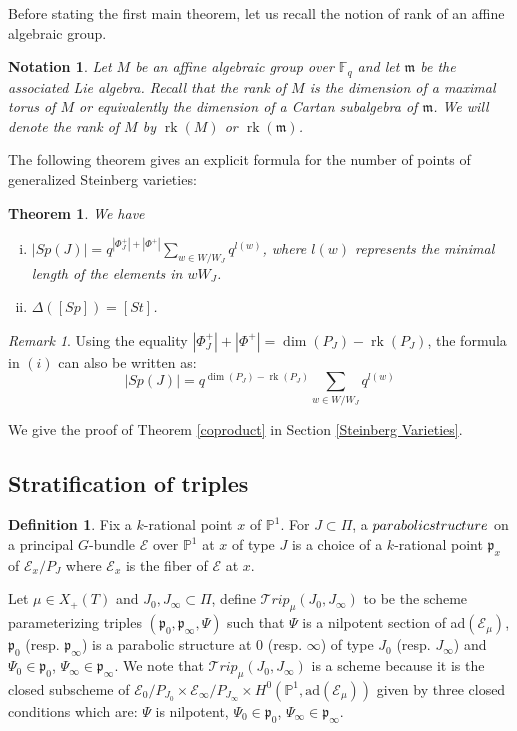 \documentclass{amsart}
\newcommand{\cE}{\mathcal{E}}
\theoremstyle{plain}
\newtheorem{theorem}{Theorem}[section]
\newtheorem{notation}{Notation}[section]
\theoremstyle{definition}
\newtheorem{definition}{Definition}
\theoremstyle{remark}
\newtheorem{remark}{Remark}[section]
\DeclareMathOperator{\rk}{rk}
\begin{document}
Before stating the first main theorem, let us recall the notion of rank of an affine algebraic group. 
\begin{notation}
 Let $M$ be an affine algebraic group over $\mathbb{F}_{q}$ and let $\mathfrak{m}$ be the associated Lie algebra. Recall that the rank of $M$ is the dimension of a maximal torus of $M$ or equivalently the dimension of a Cartan subalgebra of $\mathfrak{m}$. We will denote the rank of $M$ by $\rk(M)$ or $\rk(\mathfrak{m})$.
\end{notation}
The following theorem gives an explicit formula for the number of points of generalized Steinberg varieties: 
\begin{theorem}\label{steinberg}
We have
\begin{enumerate}[(i)]
\item $|Sp(J)|=q^{|\Phi_{J}^{+}|+|\Phi^{+}|}\sum_{w\in W/W_J}q^{l(w)}$, where $l(w)$ represents the minimal length of the elements in $wW_J$.
\item $\Delta([Sp])=[St]$.
\end{enumerate}
\end{theorem}
\begin{remark}
Using the equality $|\Phi_{J}^{+}|+|\Phi^{+}|=\dim(P_{J})-\rk(P_{J})$, the formula in $(i)$ can also be written as:
\[
|Sp(J)|=q^{\dim(P_{J})-\rk(P_{J})}\sum_{w\in W/W_J}q^{l(w)}
\]
\end{remark}
We give the proof of Theorem \ref{coproduct} in Section \ref{Steinberg Varieties}.
\subsection{Stratification of triples}\label{main theorem}
\begin{definition}
Fix a $k$-rational point $x$ of $\mathbb{P}^1$. For $J\subset\Pi$, a $\emph{parabolic structure}$ on a principal $G$-bundle $\cE$ over $\mathbb{P}^1$ at $x$ of type $J$ is a choice of a $k$-rational point $\mathfrak{p}_{x}$ of $\cE_{x}/P_{J}$ where $\cE_{x}$ is the fiber of $\cE$ at $x$.
\end{definition}
Let $\mu\in X_{+}(T)$ and $J_{0},J_{\infty}\subset\Pi$, define $\mathcal{T}rip_{\mu}(J_{0},J_{\infty})$ to be the scheme parameterizing triples $(\mathfrak{p}_{0},\mathfrak{p}_{\infty},\Psi)$ such that $\Psi$ is a nilpotent section of ad$(\cE_{\mu})$, $\mathfrak{p}_{0}$ (resp. $\mathfrak{p}_{\infty}$) is a parabolic structure at $0$ (resp. $\infty$) of type $J_{0}$ (resp. $J_{\infty}$) and $\Psi_{0}\in \mathfrak{p}_{0}$,  $\Psi_{\infty}\in \mathfrak{p}_{\infty}$. We note that $\mathcal{T}rip_{\mu}(J_{0},J_{\infty})$ is a scheme because it is the closed subscheme of $\cE_{0}/P_{J_{0}}\times\cE_{\infty}/P_{J_{\infty}}\times H^{0}(\mathbb{P}^{1},\text{ad}(\cE_{\mu}))$ given by three closed conditions which are: $\Psi$ is nilpotent, $\Psi_{0}\in \mathfrak{p}_{0}$,  $\Psi_{\infty}\in \mathfrak{p}_{\infty}$.
\end{document}
